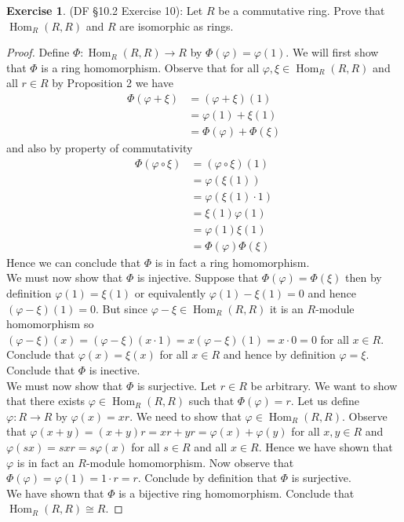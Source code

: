 \documentclass[8pt]{amsart}
\theoremstyle{plain}%
\theoremstyle{definition}
\newtheorem*{exercise}{Exercise}%
\theoremstyle{remark}
\numberwithin{equation}{section}
\begin{document}
\begin{exercise}
(DF \S 10.2 Exercise 10): Let $R$ be a commutative ring. Prove that $\operatorname{Hom}_R(R, R)$ and $R$ are isomorphic as rings.
	\begin{proof}
		Define $\Phi : \operatorname{Hom}_R(R, R) \to R$ by $\Phi(\varphi) = \varphi(1)$. We will first show that $\Phi$ is a ring homomorphism. Observe that for all $\varphi, \xi \in \operatorname{Hom}_R(R, R)$ and all $r \in R$ by Proposition 2 we have
		\begin{align*}
			\Phi(\varphi + \xi) &= (\varphi + \xi)(1)\\
			&= \varphi(1) + \xi(1)\\
			&= \Phi(\varphi) + \Phi(\xi)
		\end{align*}
		and also by property of commutativity
		\begin{align*}
			\Phi(\varphi \circ \xi) &= (\varphi \circ \xi)(1)\\
			&= \varphi(\xi(1))\\
			&= \varphi(\xi(1) \cdot 1)\\
			&= \xi(1) \varphi(1)\\
			&= \varphi(1) \xi(1)\\
			&= \Phi(\varphi) \Phi(\xi)
		\end{align*}
		Hence we can conclude that $\Phi$ is in fact a ring homomorphism.\\

		We must now show that $\Phi$ is injective. Suppose that $\Phi(\varphi) = \Phi(\xi)$ then by definition $\varphi(1) = \xi(1)$ or equivalently $\varphi(1) - \xi(1) = 0$ and hence $(\varphi - \xi)(1) = 0$. But since $\varphi - \xi \in \operatorname{Hom}_R(R, R)$ it is an $R$-module homomorphism so $(\varphi - \xi)(x) = (\varphi - \xi)(x \cdot 1) = x(\varphi - \xi)(1) = x \cdot 0 = 0$ for all $x \in R$. Conclude that $\varphi(x) = \xi(x)$ for all $x \in R$ and hence by definition $\varphi = \xi$. Conclude that $\Phi$ is inective.\\

		We must now show that $\Phi$ is surjective. Let $r \in R$ be arbitrary. We want to show that there exists $\varphi \in \operatorname{Hom}_R(R, R)$ such that $\Phi(\varphi) = r$. Let us define $\varphi : R \to R$ by $\varphi(x) = xr$. We need to show that $\varphi \in \operatorname{Hom}_R(R, R)$. Observe that $\varphi(x + y) = (x + y)r = xr + yr = \varphi(x) + \varphi(y)$ for all $x, y \in R$ and $\varphi(sx) = sxr = s\varphi(x)$ for all $s \in R$ and all $x \in R$. Hence we have shown that $\varphi$ is in fact an $R$-module homomorphism. Now observe that $\Phi(\varphi) = \varphi(1) = 1 \cdot r = r$. Conclude by definition that $\Phi$ is surjective.\\

		We have shown that $\Phi$ is a bijective ring homomorphism. Conclude that $\operatorname{Hom}_R(R, R) \cong R$.
	\end{proof}
\end{exercise}
\end{document}

